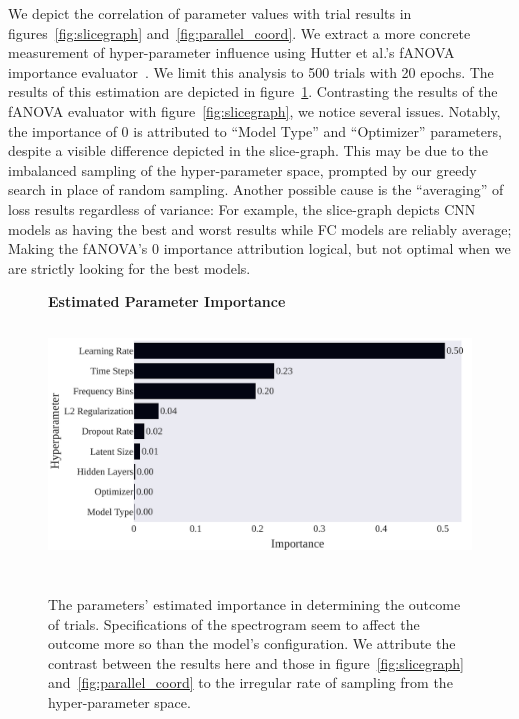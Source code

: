 \documentclass[\main/thesis.tex]{subfiles}
\begin{document}
We depict the correlation of parameter values with trial results in figures~\ref{fig:slicegraph} and~\ref{fig:parallel_coord}. We extract a more concrete measurement of hyper-parameter influence using Hutter et al.'s fANOVA importance evaluator~\cite{hutter2014efficient}. We limit this analysis to 500 trials with 20 epochs. The results of this estimation are depicted in figure~\ref{chap3:param_importance}. Contrasting the results of the fANOVA evaluator with figure~\ref{fig:slicegraph}, we notice several issues. Notably, the importance of 0 is attributed to \enquote{Model Type} and \enquote{Optimizer} parameters, despite a visible difference depicted in the slice-graph. This may be due to the imbalanced sampling of the hyper-parameter space, prompted by our greedy search in place of random sampling. Another possible cause is the \enquote{averaging} of loss results regardless of variance: For example, the slice-graph depicts CNN models as having the best and worst results while FC models are reliably average; Making the fANOVA's 0 importance attribution logical, but not optimal when we are strictly looking for the best models. 

\begin{figure}[t!]
\centering
\textbf{Estimated Parameter Importance}
\includegraphics[width=14cm,height=7cm]{images/chapter_3/ParameterImportances_final.pdf}
\caption{The parameters' estimated importance in determining the outcome of trials. Specifications of the spectrogram seem to affect the outcome more so than the model's configuration. We attribute the contrast between the results here and those in figure~\ref{fig:slicegraph} and~\ref{fig:parallel_coord} to the irregular rate of sampling from the hyper-parameter space.}
\label{chap3:param_importance}
\end{figure}
\end{document}
